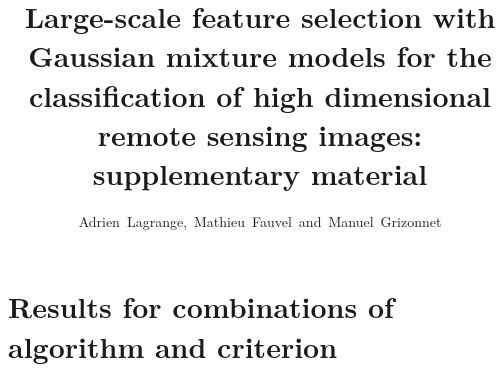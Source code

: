 \documentclass[journal,10pt,onecolumn]{IEEEtran}
\begin{document}
\title{Large-scale feature selection with Gaussian mixture models for the classification of high dimensional remote sensing images:\\supplementary material}

\author{Adrien~Lagrange,~Mathieu~Fauvel~and~Manuel~Grizonnet%
}


\maketitle

%

\section{Results for combinations of algorithm and criterion}
\label{sec:res-all}
\end{document}

